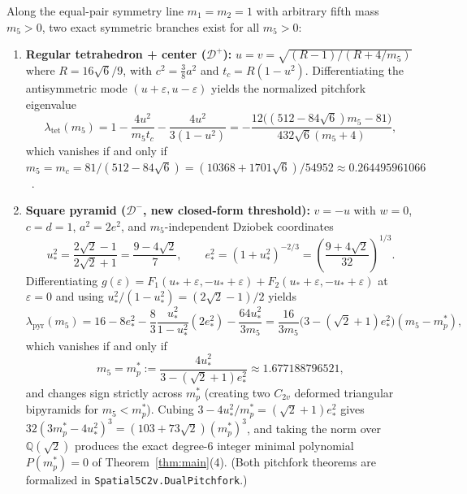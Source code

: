 \documentclass[11pt,a4paper]{amsart}
\theoremstyle{definition}
\theoremstyle{remark}
\begin{document}
Along the equal-pair symmetry line $m_1 = m_2 = 1$ with arbitrary fifth mass $m_5 > 0$,
two exact symmetric branches exist for all $m_5 > 0$:
\begin{enumerate}[label=(\arabic*)]
  \item \textbf{Regular tetrahedron + center ($\mathcal{D}^+$):}
        $u = v = \sqrt{(R - 1)/(R + 4/m_5)}$ where $R = 16\sqrt{6}/9$, with
        $c^2 = \frac{3}{8} a^2$ and $t_c = R(1 - u^2)$.
        Differentiating the antisymmetric mode $(u + \varepsilon, u - \varepsilon)$
        yields the normalized pitchfork eigenvalue
        \[
          \lambda_{\mathrm{tet}}(m_5)
          = 1 - \frac{4 u^2}{m_5 t_c} - \frac{4 u^2}{3(1 - u^2)}
          = -\frac{12\bigl((512 - 84\sqrt{6}) m_5 - 81\bigr)}{432\sqrt{6}(m_5 + 4)},
        \]
        which vanishes if and only if $m_5 = m_c = 81/(512 - 84\sqrt{6})
        = (10368 + 1701\sqrt{6})/54952 \approx 0.264495961066$~\cite{AlvarezRamirez2016}.
  \item \textbf{Square pyramid ($\mathcal{D}^-$, new closed-form threshold):}
        $v = -u$ with $w = 0$, $c = d = 1$, $a^2 = 2 e^2$, and $m_5$-independent
        Dziobek coordinates
        \[
          u_*^2 = \frac{2\sqrt{2} - 1}{2\sqrt{2} + 1} = \frac{9 - 4\sqrt{2}}{7},
          \qquad
          e_*^2 = (1 + u_*^2)^{-2/3} = \left(\frac{9 + 4\sqrt{2}}{32}\right)^{1/3}.
        \]
        Differentiating $g(\varepsilon) = F_1(u_* + \varepsilon, -u_* + \varepsilon) +
        F_2(u_* + \varepsilon, -u_* + \varepsilon)$ at $\varepsilon = 0$ and using
        $u_*^2 / (1 - u_*^2) = (2\sqrt{2} - 1)/2$ yields
        \[
          \lambda_{\mathrm{pyr}}(m_5)
          = 16 - 8 e_*^2 - \frac{8}{3}\frac{u_*^2}{1 - u_*^2}(2 e_*^2)
            - \frac{64 u_*^2}{3 m_5}
          = \frac{16}{3 m_5}\bigl(3 - (\sqrt{2}+1) e_*^2\bigr)(m_5 - m_p^*),
        \]
        which vanishes if and only if
        \[
          m_5 = m_p^* := \frac{4 u_*^2}{3 - (\sqrt{2}+1) e_*^2} \approx 1.677188796521,
        \]
        and changes sign strictly across $m_p^*$ (creating two $C_{2v}$ deformed
        triangular bipyramids for $m_5 < m_p^*$).
        Cubing $3 - 4 u_*^2 / m_p^* = (\sqrt{2}+1) e_*^2$ gives
        $32(3 m_p^* - 4 u_*^2)^3 = (103 + 73\sqrt{2})(m_p^*)^3$, and taking the norm
        over $\mathbb{Q}(\sqrt{2})$ produces the exact degree-6 integer minimal
        polynomial $P(m_p^*) = 0$ of Theorem~\ref{thm:main}(4).
        (Both pitchfork theorems are formalized in \texttt{Spatial5C2v.DualPitchfork}.)
\end{enumerate}
\end{document}

